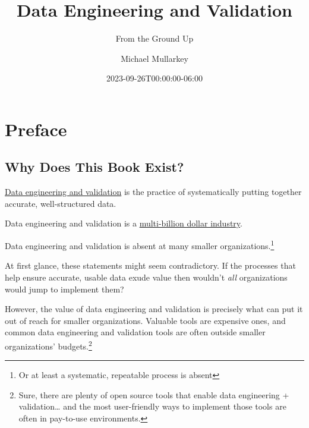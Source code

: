 \documentclass[
  letterpaper,
  DIV=11,
  numbers=noendperiod]{scrreprt}
\title{Data Engineering and Validation}
\subtitle{From the Ground Up}
\author{Michael Mullarkey}
\date{2023-09-26T00:00:00-06:00}
\renewcommand*\contentsname{Table of contents}
\newcommand\contentsname{Table of contents}
\begin{document}
\maketitle
\ifdefined\Shaded\renewenvironment{Shaded}{\begin{tcolorbox}[boxrule=0pt, enhanced, borderline west={3pt}{0pt}{shadecolor}, interior hidden, sharp corners, breakable, frame hidden]}{\end{tcolorbox}}\fi

\renewcommand*\contentsname{Table of contents}
{
\hypersetup{linkcolor=}
\setcounter{tocdepth}{2}
\tableofcontents
}

\hypertarget{preface}{%
\chapter*{Preface}\label{preface}}

\hypertarget{why-does-this-book-exist}{%
\section*{Why Does This Book Exist?}\label{why-does-this-book-exist}}

\href{https://blog.pragmaticengineer.com/what-is-data-engineering/}{Data
engineering and validation} is the practice of systematically putting
together accurate, well-structured data.

Data engineering and validation is a
\href{https://finance.yahoo.com/news/big-data-engineering-services-market-125600472.html}{multi-billion
dollar industry}.

Data engineering and validation is absent at many smaller
organizations.\footnote{Or at least a systematic, repeatable process is
  absent}

At first glance, these statements might seem contradictory. If the
processes that help ensure accurate, usable data exude value then
wouldn't \emph{all} organizations would jump to implement them?

However, the value of data engineering and validation is precisely what
can put it out of reach for smaller organizations. Valuable tools are
expensive ones, and common data engineering and validation tools are
often outside smaller organizations' budgets.\footnote{Sure, there are
  plenty of open source tools that enable data engineering +
  validation\ldots{} and the most user-friendly ways to implement those
  tools are often in pay-to-use environments.}
\end{document}
